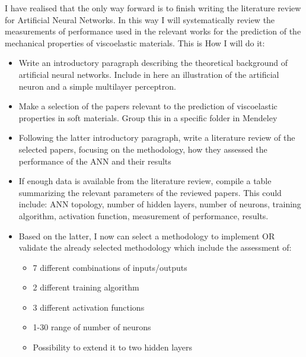 {\Huge I have realised that the only way forward is to finish writing the literature review for Artificial Neural Networks. In this way I will systematically review the measurements of performance used in the relevant works for the prediction of the mechanical properties of viscoelastic materials. This is How I will do it:}
\begin{itemize}
    \item Write an introductory paragraph describing the theoretical background of artificial neural networks. Include in here an illustration of the artificial neuron and a simple multilayer perceptron.
    \item Make a selection of the papers relevant to the prediction of viscoelastic properties in soft materials. Group this in a specific folder in Mendeley
    \item Following the latter introductory paragraph, write a literature review of the selected papers, focusing on the methodology, how they assessed the performance of the ANN and their results
    \item If enough data is available from the literature review, compile a table summarizing the relevant parameters of the reviewed papers. This could include: ANN topology, number of hidden layers, number of neurons, training algorithm, activation function, measurement of performance, results.
    \item Based on the latter, I now can select a methodology to implement OR validate the already selected methodology which include the assessment of:
    \begin{itemize}
        \item 7 different combinations of inputs/outputs
        \item 2 different training algorithm
        \item 3 different activation functions
        \item 1-30 range of number of neurons
        \item Possibility to extend it to two hidden layers
    \end{itemize}
\end{itemize}


